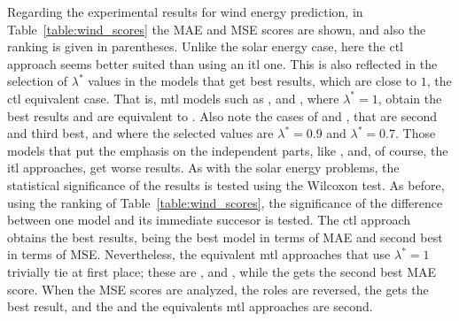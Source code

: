 
Regarding the experimental results for wind energy prediction, in Table~\ref{table:wind_scores} the MAE and MSE scores are shown, and also the ranking is given in parentheses. 
Unlike the solar energy case, here the \acrshort{ctl} approach seems better suited than using an \acrshort{itl} one. This is also reflected in the selection of $\lambda^*$ values in the models that get best results, which are close to $1$, the \acrshort{ctl} equivalent case. That is, \acrshort{mtl} models such as ,  and , where $\lambda^*=1$, obtain the best results and are equivalent to . Also note the cases of  and , that are second and third best, and where the selected values are $\lambda^*=0.9$ and $\lambda^*=0.7$.
Those models that put the emphasis on the independent parts, like , and, of course, the \acrshort{itl} approaches, get worse results.
%
%
As with the solar energy problems, the statistical significance of the results is tested using the Wilcoxon test. As before, using the ranking of Table~\ref{table:wind_scores}, the significance of the difference between one model and its immediate succesor is tested. 
%
%
The \acrshort{ctl} approach obtains the best results, being the best model in terms of MAE and second best in terms of MSE. Nevertheless, the equivalent \acrshort{mtl} approaches that use $\lambda^*=1$ trivially tie at first place; these are ,  and , while the  gets the second best MAE score.
When the MSE scores are analyzed, the roles are reversed, the  gets the best result, and the  and the equivalents \acrshort{mtl} approaches are second.

